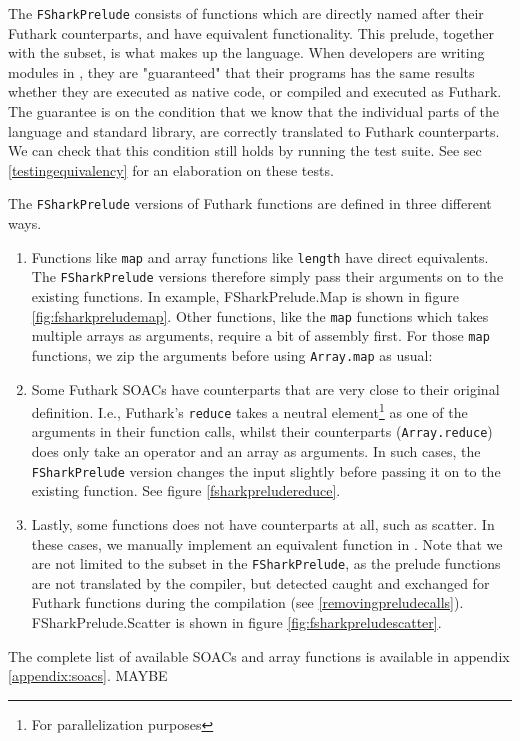 The \texttt{FSharkPrelude} consists of functions which are directly named after
their Futhark counterparts, and have equivalent functionality.
This prelude, together with the \fshark{} subset, is what makes up the \fshark{} language.
When \fshark{} developers are writing modules in \fshark{}, they are "guaranteed"
that their \fshark{} programs has the same results whether they are executed as
native \fsharp{} code, or compiled and executed as Futhark. 
The guarantee is on the condition that we know that the
individual parts of the \fshark{} language and standard library,  are correctly
translated to Futhark counterparts.
We can check that this condition still holds by running the \fshark{} test
suite. See sec \ref{testingequivalency} for an elaboration on these tests.



The \texttt{FSharkPrelude} versions of Futhark functions are defined in three
different ways.
\begin{enumerate}
  \item Functions like \texttt{map} and array functions like
    \texttt{length} have direct \fsharp{} equivalents. The
    \texttt{FSharkPrelude} versions therefore simply pass their arguments on to
    the existing functions. In example, FSharkPrelude.Map is shown in figure
    \ref{fig:fsharkpreludemap}.
    Other functions, like the \texttt{map} functions which takes multiple arrays as
    arguments, require a bit of assembly first. For those \texttt{map} functions,
    we zip the arguments before using \texttt{Array.map} as usual:

  \item Some Futhark SOACs have \fsharp{} counterparts that are very close to
    their original definition.
    I.e., Futhark's \texttt{reduce} takes a neutral element\footnote{For
      parallelization purposes} as one of the
    arguments in their function calls, whilst their \fsharp{} counterparts
    (\texttt{Array.reduce}) does only take an operator and an array as
    arguments.
    In such cases, the \texttt{FSharkPrelude} version changes the input slightly
    before passing it on to the existing function. See figure
    \ref{fsharkpreludereduce}.

  \item Lastly, some functions does not have \fsharp{} counterparts at all, such
    as scatter. In these cases, we manually implement an equivalent function in
    \fsharp{}.
    Note that we are not limited to the \fshark{} subset in the
    \texttt{FSharkPrelude}, as the prelude functions are not translated by the
    \fshark{} compiler, but detected caught and exchanged for
    Futhark functions during the \fshark{} compilation (see \ref{removingpreludecalls}).
    FSharkPrelude.Scatter is shown in figure \ref{fig:fsharkpreludescatter}.

\end{enumerate}
The complete list of available SOACs and array functions is available in
appendix \ref{appendix:soacs}. MAYBE


